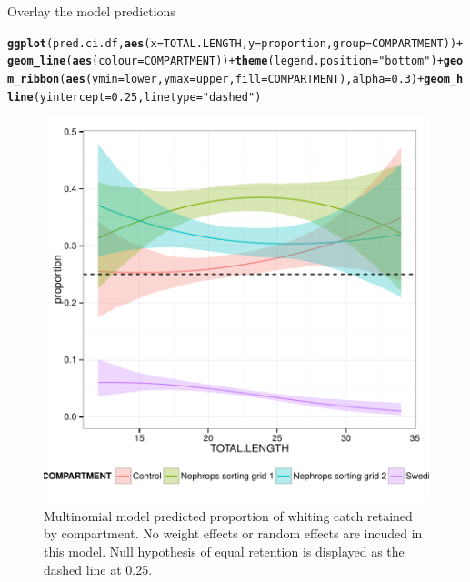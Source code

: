 \documentclass[12pt]{article}\usepackage[]{graphicx}\usepackage[]{color}
\makeatletter
\def\maxwidth{ %
  \ifdim\Gin@nat@width>\linewidth
    \linewidth
  \else
    \Gin@nat@width
  \fi
}
\newcommand{\hlnum}[1]{\textcolor[rgb]{0.686,0.059,0.569}{#1}}%
\newcommand{\hlstr}[1]{\textcolor[rgb]{0.192,0.494,0.8}{#1}}%
\newcommand{\hlopt}[1]{\textcolor[rgb]{0,0,0}{#1}}%
\newcommand{\hlstd}[1]{\textcolor[rgb]{0.345,0.345,0.345}{#1}}%
\newcommand{\hlkwc}[1]{\textcolor[rgb]{0.333,0.667,0.333}{#1}}%
\newcommand{\hlkwd}[1]{\textcolor[rgb]{0.737,0.353,0.396}{\textbf{#1}}}%
\newenvironment{kframe}{%
 \def\at@end@of@kframe{}%
 \ifinner\ifhmode%
  \def\at@end@of@kframe{\end{minipage}}%
  \begin{minipage}{\columnwidth}%
 \fi\fi%
 \def\FrameCommand##1{\hskip\@totalleftmargin \hskip-\fboxsep
 \colorbox{shadecolor}{##1}\hskip-\fboxsep
     \hskip-\linewidth \hskip-\@totalleftmargin \hskip\columnwidth}%
 \MakeFramed {\advance\hsize-\width
   \@totalleftmargin\z@ \linewidth\hsize
   \@setminipage}}%
 {\par\unskip\endMakeFramed%
 \at@end@of@kframe}
\newenvironment{knitrout}{}{} %
\makeatother
\begin{document}
Overlay the model predictions

\begin{knitrout}\footnotesize
{}\color{fgcolor}\begin{kframe}
\begin{alltt}
\hlkwd{ggplot}\hlstd{(pred.ci.df,} \hlkwd{aes}\hlstd{(}\hlkwc{x} \hlstd{= TOTAL.LENGTH,} \hlkwc{y} \hlstd{= proportion,} \hlkwc{group} \hlstd{= COMPARTMENT))} \hlopt{+} \hlkwd{geom_line}\hlstd{(}\hlkwd{aes}\hlstd{(}\hlkwc{colour} \hlstd{= COMPARTMENT))}  \hlopt{+} \hlkwd{theme}\hlstd{(}\hlkwc{legend.position} \hlstd{=} \hlstr{"bottom"}\hlstd{)} \hlopt{+} \hlkwd{geom_ribbon}\hlstd{(}\hlkwd{aes}\hlstd{(}\hlkwc{ymin} \hlstd{= lower,} \hlkwc{ymax} \hlstd{= upper,} \hlkwc{fill} \hlstd{= COMPARTMENT),} \hlkwc{alpha} \hlstd{=} \hlnum{0.3}\hlstd{)} \hlopt{+} \hlkwd{geom_hline}\hlstd{(}\hlkwc{yintercept} \hlstd{=} \hlnum{0.25}\hlstd{,} \hlkwc{linetype} \hlstd{=} \hlstr{"dashed"}\hlstd{)}
\end{alltt}
\end{kframe}\begin{figure}
\includegraphics[width=\maxwidth]{figure/unnamed-chunk-9-1} \caption[ Multinomial model predicted proportion of whiting catch retained by compartment]{ Multinomial model predicted proportion of whiting catch retained by compartment. No weight effects or random effects are incuded in this model. Null hypothesis of equal retention is displayed as the dashed line at 0.25.}\label{fig:unnamed-chunk-9}
\end{figure}


\end{knitrout}




\end{document}
